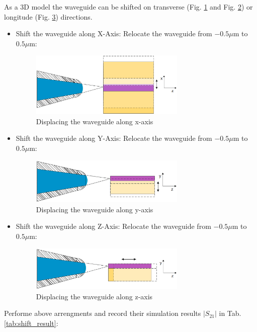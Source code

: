 As a 3D model the waveguide can be shifted on transverse (Fig. \ref{fig:shift_x_axis} and Fig. \ref{fig:shift_y_axis}) or longitude (Fig. \ref{fig:shift_z_axis}) directions.
\begin{itemize}
\item Shift the waveguide along X-Axis: Relocate the waveguide from $-0.5\mu$m to $0.5\mu$m:
\begin{figure}[!ht]
\centering
\includegraphics[width=0.7\textwidth]{bilder/shift_x_axis}
\caption{Displacing the waveguide along x-axis}
\label{fig:shift_x_axis}
\end{figure}
\item Shift the waveguide along Y-Axis: Relocate the waveguide from $-0.5\mu$m to $0.5\mu$m:
\begin{figure}[!ht]
\centering
\includegraphics[width=0.7\textwidth]{bilder/shift_y_axis}
\caption{Displacing the waveguide along y-axis}
\label{fig:shift_y_axis}
\end{figure}
\item Shift the waveguide along Z-Axis: Relocate the waveguide from $-0.5\mu$m to $0.5\mu$m:
\begin{figure}[!ht]
\centering
\includegraphics[width=0.7\textwidth]{bilder/shift_z_axis}
\caption{Displacing the waveguide along z-axis}
\label{fig:shift_z_axis}
\end{figure}
\end{itemize}
Performe above arrengments and record their simulation results $|S_{21}|$ in Tab. \ref{tab:shift_result}:\\

